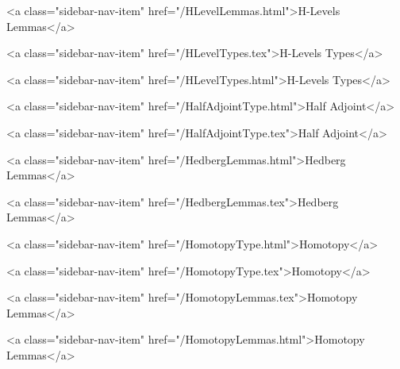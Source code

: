       
        
          <a class="sidebar-nav-item" href="/HLevelLemmas.html">H-Levels Lemmas</a>
        
      
    
      
        
          <a class="sidebar-nav-item" href="/HLevelTypes.tex">H-Levels Types</a>
        
      
    
      
        
          <a class="sidebar-nav-item" href="/HLevelTypes.html">H-Levels Types</a>
        
      
    
      
        
          <a class="sidebar-nav-item" href="/HalfAdjointType.html">Half Adjoint</a>
        
      
    
      
        
          <a class="sidebar-nav-item" href="/HalfAdjointType.tex">Half Adjoint</a>
        
      
    
      
        
          <a class="sidebar-nav-item" href="/HedbergLemmas.html">Hedberg Lemmas</a>
        
      
    
      
        
          <a class="sidebar-nav-item" href="/HedbergLemmas.tex">Hedberg Lemmas</a>
        
      
    
      
        
          <a class="sidebar-nav-item" href="/HomotopyType.html">Homotopy</a>
        
      
    
      
        
          <a class="sidebar-nav-item" href="/HomotopyType.tex">Homotopy</a>
        
      
    
      
        
          <a class="sidebar-nav-item" href="/HomotopyLemmas.tex">Homotopy Lemmas</a>
        
      
    
      
        
          <a class="sidebar-nav-item" href="/HomotopyLemmas.html">Homotopy Lemmas</a>
        
      
    
